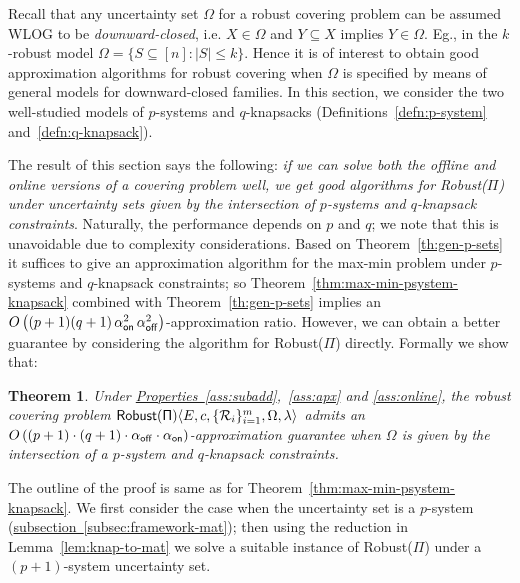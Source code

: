 \documentclass[11pt,letterpaper]{article}
\newcommand{\ignore}[1]{}
\newcommand{\lref}[2][]{\hyperref[#2]{#1~\ref*{#2}}}
\newtheorem{theorem}{Theorem}[section]
\def\cov{\ensuremath{\Pi}\xspace}
\def\rcov{{\sf Robust(\cov)}\xspace}
\newcommand{\sse}{\subseteq}
\newcommand{\offline}{\alpha_{\sf off}}
\newcommand{\online}{\alpha_{\sf on}}
\newcounter{note}[section]
\begin{document}
Recall that any uncertainty set $\Omega$ for a robust covering problem can be assumed WLOG to be {\em downward-closed},
i.e. $X\in \Omega$ and $Y\sse X$ implies $Y\in \Omega$. Eg., in the $k$-robust model $\Omega=\{S\sse[n] : |S|\le k\}$.
Hence it is of interest to obtain good approximation algorithms for robust covering when $\Omega$ is specified by means
of general models for downward-closed families. In this section, we consider the two well-studied models of $p$-systems
and $q$-knapsacks (Definitions~\ref{defn:p-system} and~\ref{defn:q-knapsack}).

\ignore{In this section, we consider robust covering problems under uncertainty sets described via $p$-systems and
knapsack constraints. Recall the framework defined in \lref[Section]{sec:notation}: we have a covering problem \cov
with $m$ requirements, and the possible second-stage scenarios are given by some downward-closed $\Omega \sse 2^{[n]}$.
Here we consider uncertainty sets specified by means of the following two well-studied models for downward-closed
families.}

The result of this section says the following: \emph{if we can solve
  both the offline and online versions of a covering problem well, we
  get good algorithms for \rcov under uncertainty sets given by the
  intersection of $p$-systems and $q$-knapsack constraints}. Naturally, the
performance depends on $p$ and $q$; we note  that this is unavoidable due to complexity considerations. Based on
Theorem~\ref{th:gen-p-sets} it suffices to give an approximation algorithm for the max-min problem under $p$-systems
and $q$-knapsack constraints; so Theorem~\ref{thm:max-min-psystem-knapsack} combined with Theorem~\ref{th:gen-p-sets}
implies an $O\left((p+1)(q+1)\,\online^2\,\offline^2\right)$-approximation ratio. However, we can obtain a better
guarantee by considering the algorithm for \rcov directly. Formally we show that:
\begin{theorem}\label{th:general}
  Under \lref[Properties]{ass:subadd},~\ref{ass:apx} and
  \ref{ass:online}, the robust covering problem $\rcov\langle E,c,
  \{\mathcal{R}_i\}_{i=1}^m, \Omega,\lambda \rangle$ admits an $O\left(
    (p+1)\cdot(q+1)\cdot \offline\cdot\online\right)$-approximation
  guarantee when $\Omega$ is given by the intersection of a $p$-system and $q$-knapsack constraints.
\end{theorem}
The outline of the proof is same as for Theorem~\ref{thm:max-min-psystem-knapsack}. We first consider the case when the
uncertainty set is a $p$-system (\lref[subsection]{subsec:framework-mat}); then using the reduction in
Lemma~\ref{lem:knap-to-mat} we solve a suitable instance of \rcov under a $(p+1)$-system uncertainty set.
\end{document}
